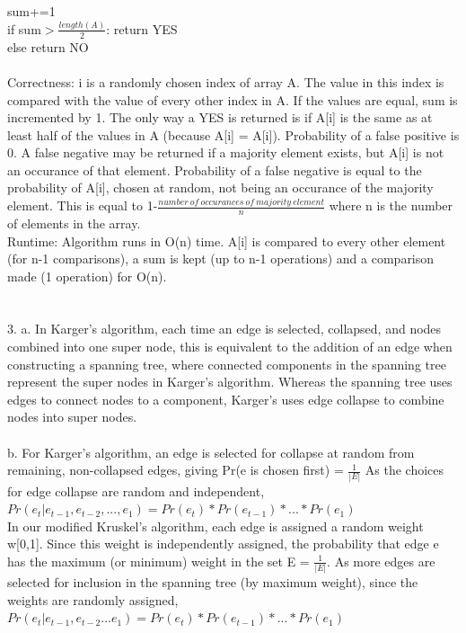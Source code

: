 \documentclass[11pt, oneside]{article}   	%
\begin{document}
\indent\indent\indent sum+=1\\
\indent\indent if sum$>$$\frac{length(A)}{2}$: return YES\\
\indent\indent else return NO\\\\
Correctness:  i is a randomly chosen index of array A.  The value in this index is compared with the value of every other index in A.  If the values are equal, sum is incremented by 1.  The only way a YES is returned is if A[i] is the same as at least half of the values in A (because A[i] = A[i]).  Probability of a false positive is 0.  A false negative may be returned if a majority element exists, but A[i] is not an occurance of that element.  Probability of a false negative is equal to the probability of A[i], chosen at random, not being an occurance of the majority element.  This is equal to 1-$\frac{number\ of\ occurances\ of\ majority\ element}{n}$ where n is the number of elements in the array.\\
Runtime:  Algorithm runs in O(n) time.  A[i] is compared to every other element (for n-1 comparisons), a sum is kept (up to n-1 operations) and a comparison made (1 operation) for O(n).\\\\\\
3. a.  In Karger's algorithm, each time an edge is selected, collapsed, and nodes combined into one super node, this is equivalent to the addition of an edge when constructing a spanning tree, where connected components in the spanning tree represent the super nodes in Karger's algorithm.  Whereas the spanning tree uses edges to connect nodes to a component, Karger's uses edge collapse to combine nodes into super nodes.\\\\
b.  For Karger's algorithm, an edge is selected for collapse at random from remaining, non-collapsed edges, giving Pr(e is chosen first) = $\frac{1}{|E|}$  As the choices for edge collapse are random and independent, $Pr(e_t|e_{t-1},e_{t-2},...,e_1) = Pr(e_t) * Pr(e_{t-1}) * ... * Pr(e_1)$\\
\indent In our modified Kruskel's algorithm, each edge is assigned a random weight w[0,1].  Since this weight is independently assigned, the probability that edge e has the maximum (or minimum) weight in the set E = $\frac{1}{|E|}$.  As more edges are selected for inclusion in the spanning tree (by maximum weight), since the weights are randomly assigned, $Pr(e_t |e_{t-1},e_{t-2}...e_{1}) = Pr(e_t) * Pr(e_{t-1}) * ... * Pr(e_1)$\\
$$
\end{document}
